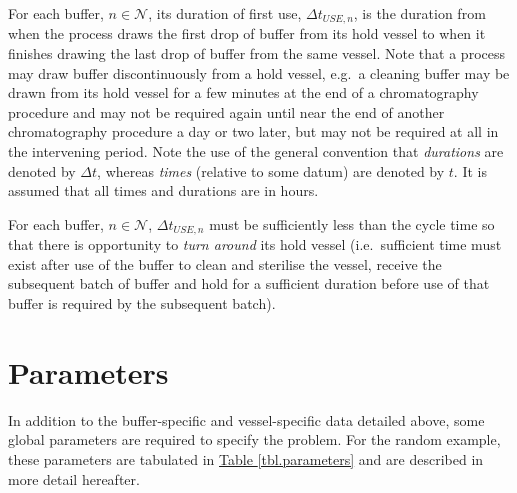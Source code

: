 For each buffer, $n \in \mathcal{N}$, its duration of first use,
$\Delta t_{\mathit{USE},n}$, is the duration from when the process draws the
first drop of buffer from its hold vessel to when it finishes drawing the last
drop of buffer from the same vessel.
Note that a process may draw buffer discontinuously from a hold vessel, e.g.\ a
cleaning buffer may be drawn from its hold vessel for a few minutes at the end
of a chromatography procedure and may not be required again until near the end
of another chromatography procedure a day or two later, but may not be required
at all in the intervening period.
Note the use of the general convention that \emph{durations} are denoted by
$\Delta t$, whereas \emph{times} (relative to some datum) are denoted by $t$.
It is assumed that all times and durations are in hours.

For each buffer, $n \in \mathcal{N}$, $\Delta t_{\mathit{USE},n}$ must be
sufficiently less than the cycle time so that there is opportunity to
\emph{turn around} its hold vessel (i.e.\ sufficient time must exist after use
of the buffer to clean and sterilise the vessel, receive the subsequent batch
of buffer and hold for a sufficient duration before use of that buffer is
required by the subsequent batch).

\section{Parameters}\label{S.parameters}

In addition to the buffer-specific and vessel-specific data detailed above,
some global parameters are required to specify the problem.
For the random example, these parameters are tabulated in
\hyperref[tbl.parameters]{Table \ref*{tbl.parameters}} and are described in
more detail hereafter.

